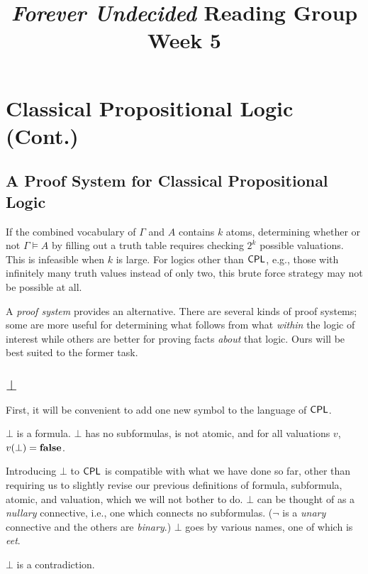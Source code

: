 \documentclass{article}
\title{\emph{Forever Undecided} Reading Group \\ Week 5}
\date{}
\author{}
\begin{document}
\maketitle

\section*{Classical Propositional Logic (Cont.)}

\subsection*{A Proof System for Classical Propositional Logic}

If the combined vocabulary of $\Gamma$ and $A$ contains $k$ atoms, determining whether or not $\Gamma \models A$ by filling out a truth table requires checking $2^k$ possible valuations. This is infeasible when $k$ is large. For logics other than $\mathsf{CPL}$, e.g., those with infinitely many truth values instead of only two, this brute force strategy may not be possible at all.

A \textit{proof system} provides an alternative. There are several kinds of proof systems; some are more useful for determining what follows from what \textit{within} the logic of interest while others are better for proving facts \textit{about} that logic. Ours will be best suited to the former task.

\subsection*{$\bot$}

First, it will be convenient to add one new symbol to the language of  $\mathsf{CPL}$. 
\begin{definition}
    $\bot$ is a formula. $\bot$ has no subformulas, is not atomic, and for all valuations $v$, $v(\bot) = \mathbf{false}$.
\end{definition}

Introducing $\bot$ to $\mathsf{CPL}$ is compatible with what we have done so far, other than requiring us to slightly revise our previous definitions of formula, subformula, atomic, and valuation, which we will not bother to do. $\bot$ can be thought of as a \textit{nullary} connective, i.e., one which connects no subformulas. ($\neg$ is a \textit{unary} connective and the others are \textit{binary}.) $\bot$ goes by various names, one of which is \textit{eet}.

\begin{proposition}
    $\bot$ is a contradiction.
\end{proposition}
\end{document}
